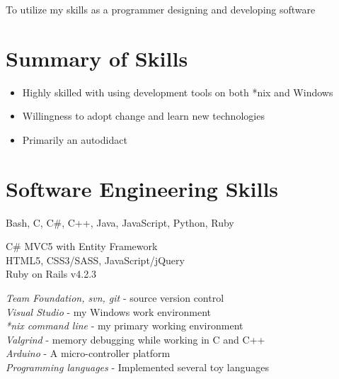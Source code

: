 \documentclass[10pt]{article} %
\begin{document}
To utilize my skills as a programmer designing and developing software


\vspace{-4mm}
\section{Summary of Skills}
\vspace{-3mm}

\begin{itemize}
\item Highly skilled with using development tools on both *nix and Windows
\vspace{-3mm}
\item Willingness to adopt change and learn new technologies
\vspace{-3mm}
\item Primarily an autodidact
\vspace{-3mm}
\end{itemize}

\section{Software Engineering Skills}
\vspace{-3mm}

{
  Bash, C, C\#, C++, Java, JavaScript, Python, Ruby
}


{
  C\# MVC5 with Entity Framework \\
  HTML5, CSS3/SASS, JavaScript/jQuery \\
  Ruby on Rails v4.2.3
}


{
\textit{Team Foundation, svn, git} - source version control \\
\textit{Visual Studio} - my Windows work environment \\
\textit{*nix command line} - my primary working environment \\
\textit{Valgrind} - memory debugging while working in C and C++ \\
\textit{Arduino} - A micro-controller platform \\
\textit{Programming languages} - Implemented several toy languages
}
\end{document}
